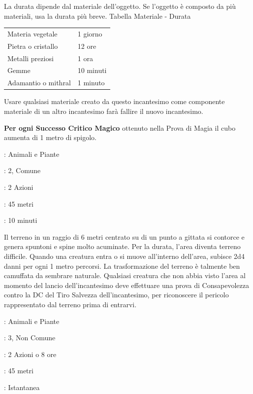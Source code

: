 \begin{multicols}{2}
La durata dipende dal materiale dell'oggetto. Se l'oggetto è composto da più materiali, usa la durata più breve.
\medskip
Tabella Materiale - Durata
\medskip

\noindent\begin{tabularx}{0.45\textwidth}{lX}
	\toprule
	Materia vegetale &1 giorno\\
	Pietra o cristallo &12 ore\\
	Metalli preziosi &1 ora\\
	Gemme &10 minuti\\
	Adamantio o mithral &1 minuto
\end{tabularx}
\medskip

Usare qualsiasi materiale creato da questo incantesimo come componente materiale di un altro incantesimo farà fallire il nuovo incantesimo.

\textbf{Per ogni Successo Critico Magico} ottenuto nella Prova di Magia il cubo aumenta di 1 metro di spigolo.

\noindent\colorbox{OBSSgold!10}{
\begin{minipage}{0.95\linewidth}
\begin{description}[noitemsep, topsep=0pt, parsep=0pt, partopsep=0pt, leftmargin=0cm, labelwidth=1.3cm]
	\item[\textbf{Lista}]: Animali e Piante
	\item[\textbf{Livello}]: 2, Comune
	\item[\textbf{Lancio}]: 2 Azioni
	\item[\textbf{Gittata}]: 45 metri
	\item[\textbf{Durata}]: 10 minuti
\end{description}
\end{minipage}}\smallskip

Il terreno in un raggio di 6 metri centrato su di un punto a gittata si contorce e genera spuntoni e spine molto acuminate. Per la durata, l'area diventa terreno difficile. Quando una creatura entra o si muove all'interno dell'area, subisce 2d4 danni per ogni 1 metro percorsi.
La trasformazione del terreno è talmente ben camuffata da sembrare naturale. Qualsiasi creatura che non abbia visto l'area al momento del lancio dell'incantesimo deve effettuare una prova di Consapevolezza contro la DC del Tiro Salvezza dell'incantesimo, per riconoscere il pericolo rappresentato dal terreno prima di entrarvi.

\noindent\colorbox{OBSSgold!10}{
\begin{minipage}{0.95\linewidth}
\begin{description}[noitemsep, topsep=0pt, parsep=0pt, partopsep=0pt, leftmargin=0cm, labelwidth=1.3cm]
	\item[\textbf{Lista}]: Animali e Piante
	\item[\textbf{Livello}]: 3, Non Comune
	\item[\textbf{Lancio}]: 2 Azioni o 8 ore
	\item[\textbf{Gittata}]: 45 metri
	\item[\textbf{Durata}]: Istantanea
\end{description}
\end{minipage}}\smallskip


\end{multicols}
